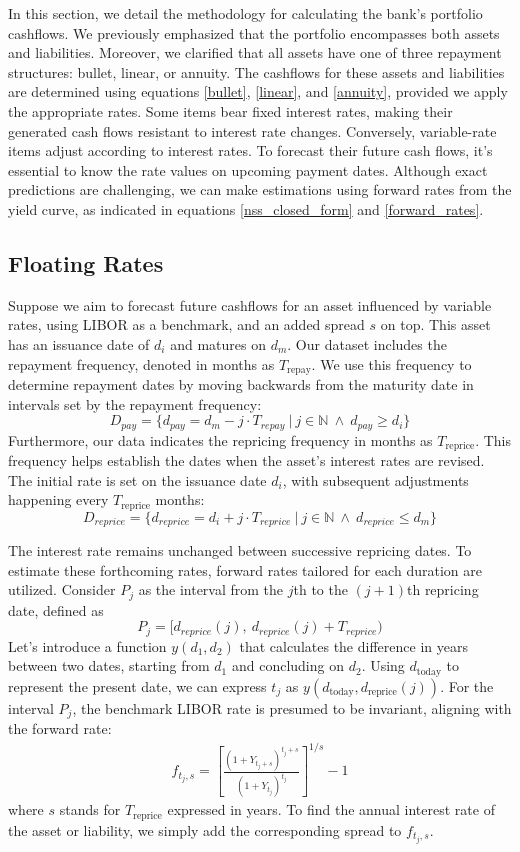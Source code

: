 \documentclass[11pt]{report}
\begin{document}
In this section, we detail the methodology for calculating the bank's portfolio cashflows. We previously emphasized that the portfolio encompasses both assets and liabilities. Moreover, we clarified that all assets have one of three repayment structures: bullet, linear, or annuity. The cashflows for these assets and liabilities are determined using equations \eqref{bullet}, \eqref{linear}, and \eqref{annuity}, provided we apply the appropriate rates. Some items bear fixed interest rates, making their generated cash flows resistant to interest rate changes. Conversely, variable-rate items adjust according to interest rates. To forecast their future cash flows, it's essential to know the rate values on upcoming payment dates. Although exact predictions are challenging, we can make estimations using forward rates from the yield curve, as indicated in equations \eqref{nss_closed_form} and \eqref{forward_rates}.

\subsection{Floating Rates}


Suppose we aim to forecast future cashflows for an asset influenced by variable rates, using LIBOR as a benchmark, and an added spread \(s\) on top. This asset has an issuance date of \(d_i\) and matures on \(d_m\). Our dataset includes the repayment frequency, denoted in months as \(T_{\text{repay}}\). We use this frequency to determine repayment dates by moving backwards from the maturity date in intervals set by the repayment frequency:
$$D_{pay}=\{d_{pay}=d_m-j\cdot T_{repay}\ |\ j\in \mathbb{N}\ \wedge\ d_{pay}\geq d_i\}$$
Furthermore, our data indicates the repricing frequency in months as \(T_{\text{reprice}}\). This frequency helps establish the dates when the asset's interest rates are revised. The initial rate is set on the issuance date \(d_i\), with subsequent adjustments happening every \(T_{\text{reprice}}\) months:
 $$D_{reprice}= \{d_{reprice}=d_i+j\cdot T_{reprice}\ |\ j\in\mathbb{N}\ \wedge\ d_{reprice} \leq d_m\}$$

The interest rate remains unchanged between successive repricing dates. To estimate these forthcoming rates, forward rates tailored for each duration are utilized. Consider $P_j$ as the interval from the $j$th to the $(j+1)$th repricing date, defined as
$$P_j=[d_{reprice}(j),\ d_{reprice}(j)+T_{reprice})$$
Let's introduce a function \(y(d_1,d_2)\) that calculates the difference in years between two dates, starting from \(d_1\) and concluding on \(d_2\). Using \(d_{\text{today}}\) to represent the present date, we can express \(t_j\) as \(y(d_{\text{today}},d_{\text{reprice}}(j))\). For the interval \(P_j\), the benchmark LIBOR rate is presumed to be invariant, aligning with the forward rate:
\begin{align}
	f_{t_j,s}=\left[ \frac{(1 + Y_{t_j+s})^{t_j+s}}{(1 + Y_{t_j})^{t_j}} \right]^{1/s} - 1	
\end{align}
where \(s\) stands for \(T_{\text{reprice}}\) expressed in years. To find the annual interest rate of the asset or liability, we simply add the corresponding spread to $f_{t_j,s}$.\\
\end{document}
